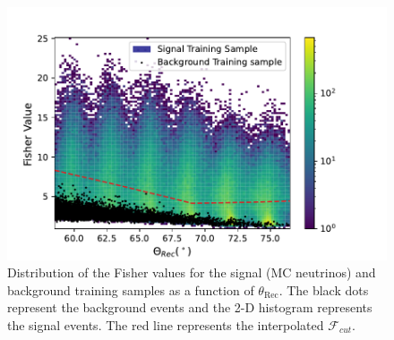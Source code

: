 \begin{figure}[h!]
  \centering
  \includegraphics[width=14.5cm]{thesis_figures/Nu_analysis/Fisher_plots/Fisher_comp_bkg_sim_wnt.pdf}
  \caption{Distribution of the Fisher values for the signal (MC neutrinos) and background training samples as a function of $\theta_{\text{Rec}}$. The black dots represent the background events and the 2-D histogram represents the signal events. The red line represents the interpolated $\mathcal{F}_{cut}$.}
  \label{fig:Fish_bkg_sig}
\end{figure}


